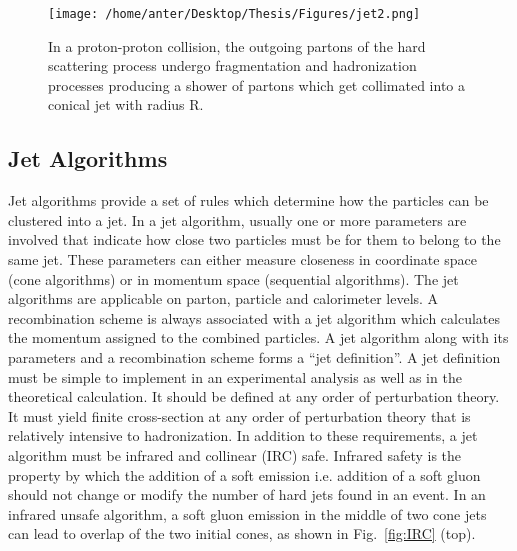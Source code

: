 \begin{figure}[!h]
\begin{center}
\hspace*{-7mm}
\texttt{[image: /home/anter/Desktop/Thesis/Figures/jet2.png]}\\
\vspace*{4mm}
\caption[Formation of a jet in a proton-proton collision.]{In a proton-proton collision, the outgoing partons of the hard scattering process undergo fragmentation and hadronization processes producing a shower of partons which get collimated into a conical jet with radius R.}
\label{fig:jet_r}
\end{center}
\end{figure}

\subsection{Jet Algorithms}
\label{sec:jet_algos}
Jet algorithms \cite{Salam:2009jx} provide a set of rules which determine how the particles can be clustered into a jet. In a jet algorithm, usually one or more parameters are involved that indicate how close two particles must be for them to belong to the same jet. These parameters can either measure closeness in coordinate space (cone algorithms) or in momentum space (sequential algorithms). The jet algorithms are applicable on parton, particle and calorimeter levels. A recombination scheme is always associated with a jet algorithm which calculates the momentum assigned to the combined particles. A jet algorithm along with its parameters and a recombination scheme forms a ``jet definition''. A jet definition \cite{Ellis:1989vm} must be simple to implement in an experimental analysis as well as in the theoretical calculation. It should be defined at any order of perturbation theory. It must yield finite cross-section at any order of perturbation theory that is relatively intensive to hadronization. In addition to these requirements, a jet algorithm must be infrared and collinear (IRC) safe. Infrared safety is the property by which the addition of a soft emission i.e. addition of a soft gluon should not change or modify the number of hard jets found in an event. In an infrared unsafe algorithm, a soft gluon emission in the middle of two cone jets can lead to overlap of the two initial cones, as shown in Fig.~\ref{fig:IRC} (top). 
